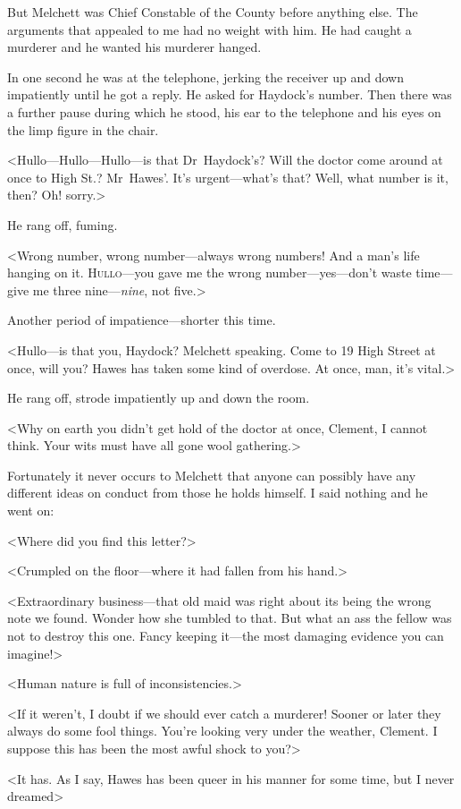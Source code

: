 But Melchett was Chief Constable of the County before anything else. The arguments that appealed to me had no weight with him. He had caught a murderer and he wanted his murderer hanged.

In one second he was at the telephone, jerking the receiver up and down impatiently until he got a reply. He asked for Haydock's number. Then there was a further pause during which he stood, his ear to the telephone and his eyes on the limp figure in the chair.

<Hullo—Hullo—Hullo—is that Dr~Haydock's? Will the doctor come around at once to High St.? Mr~Hawes'. It's urgent—what's that? Well, what number is it, then? Oh! sorry.>

He rang off, fuming.

<Wrong number, wrong number—always wrong numbers! And a man's life hanging on it. \textsc{Hullo}—you gave me the wrong number—yes—don't waste time—give me three nine—\emph{nine}, not five.>

Another period of impatience—shorter this time.

<Hullo—is that you, Haydock? Melchett speaking. Come to 19 High Street at once, will you? Hawes has taken some kind of overdose. At once, man, it's vital.>

He rang off, strode impatiently up and down the room.

<Why on earth you didn't get hold of the doctor at once, Clement, I cannot think. Your wits must have all gone wool gathering.>

Fortunately it never occurs to Melchett that anyone can possibly have any different ideas on conduct from those he holds himself. I said nothing and he went on:

<Where did you find this letter?>

<Crumpled on the floor—where it had fallen from his hand.>

<Extraordinary business—that old maid was right about its being the wrong note we found. Wonder how she tumbled to that. But what an ass the fellow was not to destroy this one. Fancy keeping it—the most damaging evidence you can imagine!>

<Human nature is full of inconsistencies.>

<If it weren't, I doubt if we should ever catch a murderer! Sooner or later they always do some fool things. You're looking very under the weather, Clement. I suppose this has been the most awful shock to you?>

<It has. As I say, Hawes has been queer in his manner for some time, but I never dreamed\longdash>

